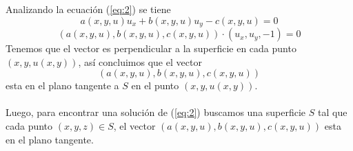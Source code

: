 \documentclass{article}
\begin{document}
Analizando la ecuación (\ref{eq:2}) se tiene
\[a(x,y,u)u_x+b(x,y,u)u_y-c(x,y,u)=0\]
\[(a(x,y,u),b(x,y,u),c(x,y,u))\cdot(u_x,u_y,-1)=0\]
Tenemos que el vector es perpendicular a la superficie en cada punto $(x,y,u(x,y))$, así concluimos que el vector
\[(a(x,y,u),b(x,y,u),c(x,y,u))\]
esta en el plano tangente a $S$ en el punto $(x,y,u(x,y))$.\\\\
Luego, para encontrar una solución de (\ref{eq:2}) buscamos una superficie $S$ tal que cada punto $(x,y,z)\in S$, el vector $(a(x,y,u),b(x,y,u),c(x,y,u))$ esta en el plano tangente.
\begin{center}
    


\begin{tikzpicture}[x=0.75pt,y=0.75pt,yscale=-1,xscale=1]


\end{tikzpicture}
\end{center}
\end{document}
